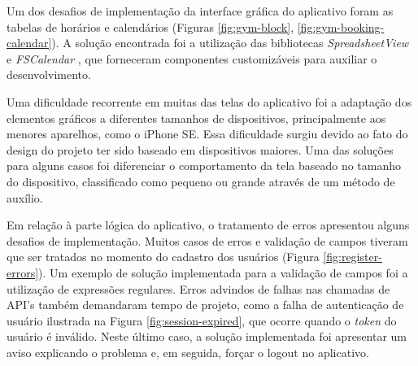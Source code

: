 Um dos desafios de implementação da interface gráfica do aplicativo foram as tabelas de horários e calendários (Figuras \ref{fig:gym-block}, \ref{fig:gym-booking-calendar}). A solução encontrada foi a utilização das bibliotecas \textit{SpreadsheetView} e \textit{FSCalendar} , que forneceram componentes customizáveis para auxiliar o desenvolvimento.

Uma dificuldade recorrente em muitas das telas do aplicativo foi a adaptação dos elementos gráficos a diferentes tamanhos de dispositivos, principalmente aos menores aparelhos, como o iPhone SE. Essa dificuldade surgiu devido ao fato do design do projeto ter sido baseado em dispositivos maiores. Uma das soluções para alguns casos foi diferenciar o comportamento da tela baseado no tamanho do dispositivo, classificado como pequeno ou grande através de um método de auxílio.

Em relação à parte lógica do aplicativo, o tratamento de erros apresentou alguns desafios de implementação. Muitos casos de erros e validação de campos tiveram que ser tratados no momento do cadastro dos usuários (Figura \ref{fig:register-errors}). Um exemplo de solução implementada para a validação de campos foi a utilização de expressões regulares. Erros advindos de falhas nas chamadas de API's também demandaram tempo de projeto, como a falha de autenticação de usuário ilustrada na Figura \ref{fig:session-expired}, que ocorre quando o \textit{token} do usuário é inválido. Neste último caso, a solução implementada foi apresentar um aviso explicando o problema e, em seguida, forçar o logout no aplicativo.

